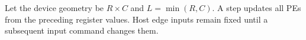 Let the device geometry be $R\times C$ and $L=\min(R,C)$. A step updates all
PEs from the preceding register values. Host edge inputs remain fixed until
a subsequent input command changes them.
